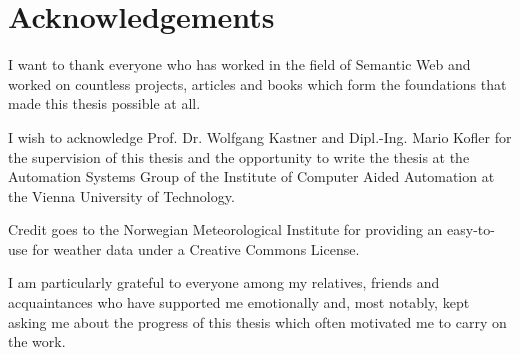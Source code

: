 \chapter*{Acknowledgements}

I want to thank everyone who has worked in the field of Semantic Web and worked on countless projects, articles and books which form the foundations that made this thesis possible at all.

I wish to acknowledge Prof. Dr. Wolfgang Kastner and Dipl.-Ing. Mario Kofler for the supervision of this thesis and the opportunity to write the thesis at the Automation Systems Group of the Institute of Computer Aided Automation at the Vienna University of Technology.

Credit goes to the Norwegian Meteorological Institute for providing an easy-to-use  for weather data under a Creative Commons License.

I am particularly grateful to everyone among my relatives, friends and acquaintances who have supported me emotionally and, most notably, kept asking me about the progress of this thesis which often motivated me to carry on the work.